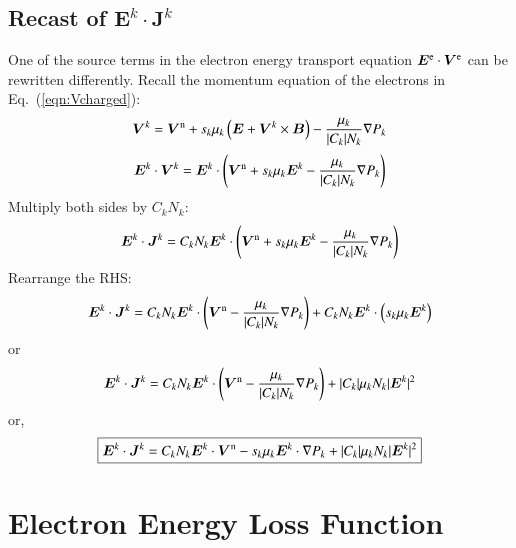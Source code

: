 \documentclass{warpdoc}
\newcommand\frameeqn[1]{\fbox{$\displaystyle #1$}}
\renewcommand{\vec}[1]{\bm{#1}}
\begin{document}
%

\subsection{Recast of $\vec{E}^k \cdot \vec{J}^k$}

One of the source terms in the electron energy transport equation $\vec{E}^{\rm e} \cdot \vec{V}^{\rm e}$ can be rewritten differently. Recall the momentum equation of the electrons in Eq.\ (\ref{eqn:Vcharged}):
%
\begin{equation}
  \vec{V}^k=\vec{V}^{\rm n} + s_k \mu_k \left(\vec{E}+\vec{V}^k \times \vec{B}\right)-\frac{\mu_k}{|C_k| N_k}\nabla P_k
\end{equation}
% 
%
\begin{equation}
\vec{E}^k \cdot \vec{V}^k 
 = \vec{E}^k \cdot \left( \vec{V}^{\rm n} + s_k \mu_k \vec{E}^k-\frac{\mu_k}{|C_k| N_k}\nabla P_k \right)
\end{equation}
% 
Multiply both sides by $C_k N_k$:
%
\begin{equation}
\vec{E}^k \cdot \vec{J}^k 
 = C_k N_k \vec{E}^k \cdot \left( \vec{V}^{\rm n} + s_k \mu_k \vec{E}^k-\frac{\mu_k}{|C_k| N_k}\nabla P_k \right)
\end{equation}
% 
Rearrange the RHS:
%
\begin{equation}
\vec{E}^k \cdot \vec{J}^k 
 = C_k N_k \vec{E}^k \cdot \left( \vec{V}^{\rm n} -\frac{\mu_k}{|C_k| N_k}\nabla P_k \right)
  +C_k N_k \vec{E}^k \cdot \left(  s_k \mu_k \vec{E}^k \right)
\end{equation}
% 
or
%
\begin{equation}
\vec{E}^k \cdot \vec{J}^k 
 = C_k N_k \vec{E}^k \cdot \left( \vec{V}^{\rm n} -\frac{\mu_k}{|C_k| N_k}\nabla P_k \right)
  +|C_k| \mu_k N_k |\vec{E}^k|^2
\end{equation}
% 
or,
%
\begin{equation}
\frameeqn{
\vec{E}^k \cdot \vec{J}^k 
 =   C_k N_k \vec{E}^k \cdot \vec{V}^{\rm n} - s_k \mu_k \vec{E}^k \cdot \nabla P_k 
  +|C_k| \mu_k N_k |\vec{E}^k|^2
}
\end{equation}
% 


\section{Electron Energy Loss Function}
\end{document}
